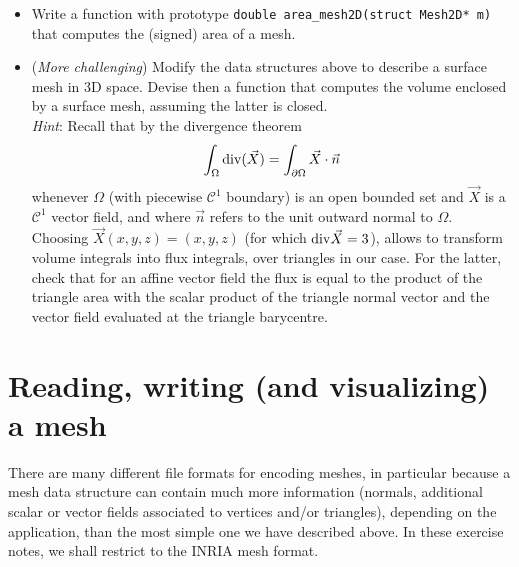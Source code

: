 \documentclass[a4paper,12pt]{article}
\begin{document}
\begin{itemize}
\item[5)] Write a function with prototype \texttt{double area\_mesh2D(struct Mesh2D* m)} that computes the (signed) area of a mesh.

\item[6)] ({\it More challenging}) Modify the data structures above to describe a surface mesh in 3D space. Devise then a function that computes the volume enclosed by a surface mesh, assuming the latter is closed.\\
{\it Hint}: Recall that by the divergence theorem 
$$\int_\Omega {\rm div}( \vec X) = \int_{\partial\Omega} \vec X \cdot \vec n$$
whenever $\Omega$ (with piecewise $\mathcal{C}^1$ boundary) is an open bounded set and
$\vec X$ is a $\mathcal{C}^1$ vector field, and where $\vec n$ refers to the unit outward normal 
to $\Omega.$ Choosing $\vec X(x,y,z) = (x,y,z)$ 
(for which ${\rm div}\vec X = 3$), allows to transform volume integrals into
flux integrals, over triangles in our case. For the latter, check that for an
affine vector field the flux is equal to the product of the triangle area with
the scalar product of the triangle normal vector and the vector field evaluated
at the triangle barycentre.

\end{itemize}

\section{Reading, writing (and visualizing) a mesh}

There are many different file formats for encoding meshes, in particular because a mesh data structure can contain much more information (normals, additional scalar or vector fields associated to vertices and/or triangles), depending on the application, than the most simple one we have described above. In these exercise notes, we shall restrict to the INRIA mesh format.
\end{document}
